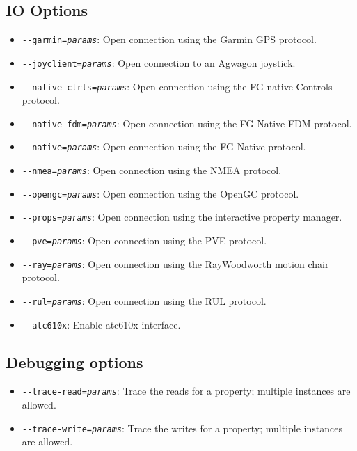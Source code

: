 \subsection{IO Options}
\begin{itemize}
\item{\texttt{-$ $-garmin={\it params}}}: Open connection using the Garmin GPS protocol.
\item{\texttt{-$ $-joyclient={\it params}}}: Open connection to an Agwagon joystick.
\item{\texttt{-$ $-native-ctrls={\it params}}}: Open connection using the FG native Controls protocol.
\item{\texttt{-$ $-native-fdm={\it params}}}: Open connection using the FG Native FDM protocol.
\item{\texttt{-$ $-native={\it params}}}: Open connection using the FG Native protocol.
\item{\texttt{-$ $-nmea={\it params}}}: Open connection using the NMEA protocol.
\item{\texttt{-$ $-opengc={\it params}}}: Open connection using the OpenGC protocol.
\item{\texttt{-$ $-props={\it params}}}: Open connection using the interactive property manager.
\item{\texttt{-$ $-pve={\it params}}}: Open connection using the PVE protocol.
\item{\texttt{-$ $-ray={\it params}}}: Open connection using the RayWoodworth motion chair protocol.
\item{\texttt{-$ $-rul={\it params}}}: Open connection using the RUL protocol.
\item{\texttt{-$ $-atc610x}}: Enable atc610x interface.
\end{itemize}

\subsection{Debugging options}
\begin{itemize}
\item{\texttt{-$ $-trace-read={\it params}}}: Trace the reads for a property; multiple instances are allowed.
\item{\texttt{-$ $-trace-write={\it params}}}: Trace the writes for a property; multiple instances are allowed.
\end{itemize}



